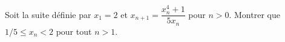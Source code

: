 Soit la suite définie par $x_1 = 2$ et $x_{n+1} = \dfrac{x_n^4 + 1}{5x_n}$ pour $n > 0$. Montrer que $1/5 \leq x_n < 2$ pour tout $n > 1$.
